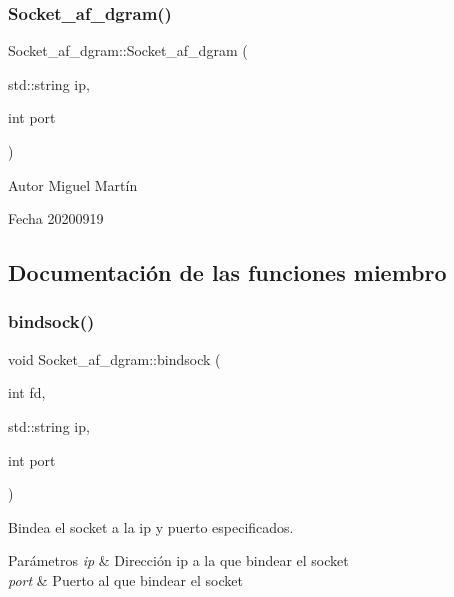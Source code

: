 \subsubsection{\texorpdfstring{Socket\+\_\+af\+\_\+dgram()}{Socket\_af\_dgram()}}
{\footnotesize\ttfamily Socket\+\_\+af\+\_\+dgram\+::\+Socket\+\_\+af\+\_\+dgram (\begin{DoxyParamCaption}\item[{std\+::string}]{ip,  }\item[{int}]{port }\end{DoxyParamCaption})}

\begin{DoxyAuthor}{Autor}
Miguel Martín 
\end{DoxyAuthor}
\begin{DoxyDate}{Fecha}
20200919 
\end{DoxyDate}


\subsection{Documentación de las funciones miembro}
\mbox{\label{classSocket__af__dgram_a6a2084d50ab117b0bf6b699aa0573db5}} 
\subsubsection{\texorpdfstring{bindsock()}{bindsock()}}
{\footnotesize\ttfamily void Socket\+\_\+af\+\_\+dgram\+::bindsock (\begin{DoxyParamCaption}\item[{int}]{fd,  }\item[{std\+::string}]{ip,  }\item[{int}]{port }\end{DoxyParamCaption})}



Bindea el socket a la ip y puerto especificados. 


\begin{DoxyParams}{Parámetros}
{\em ip} & Dirección ip a la que bindear el socket \\
\hline
{\em port} & Puerto al que bindear el socket \\
\hline
\end{DoxyParams}
\mbox{\label{classSocket__af__dgram_a35d37ff27ecbb87d2e0ca12dae78b67c}} 
